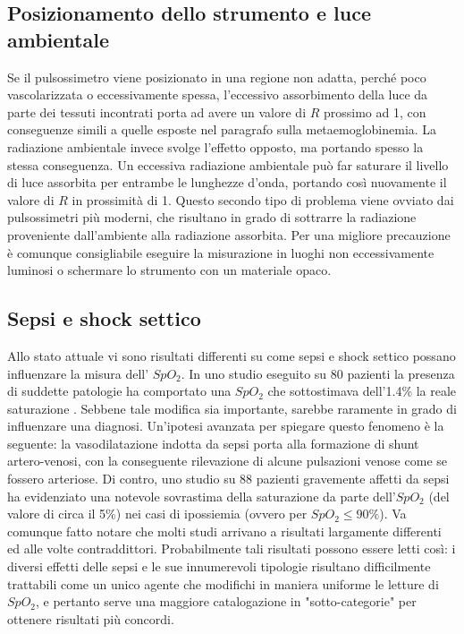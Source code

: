 \documentclass[12pt,a4paper, twoside, openright]{report}
\begin{document}
\subsection{Posizionamento dello strumento e luce ambientale}

Se il pulsossimetro viene posizionato in una regione non adatta, perché poco vascolarizzata o eccessivamente spessa, l'eccessivo assorbimento della luce da parte dei tessuti incontrati porta ad avere un valore di $R$ prossimo ad 1, con conseguenze simili a quelle esposte nel paragrafo sulla metaemoglobinemia. 
La radiazione ambientale invece svolge l'effetto opposto, ma portando spesso la stessa conseguenza. 
Un eccessiva radiazione ambientale può far saturare il livello di luce assorbita per entrambe le lunghezze d'onda, portando così nuovamente il valore di $R$ in prossimità di 1. 
Questo secondo tipo di problema viene ovviato dai pulsossimetri più moderni, che risultano in grado di sottrarre la radiazione proveniente dall'ambiente alla radiazione assorbita. 
Per una migliore precauzione è comunque consigliabile eseguire la misurazione in luoghi non eccessivamente luminosi o schermare lo strumento con un materiale opaco.


\subsection{Sepsi e shock settico}

Allo stato attuale vi sono risultati differenti su come sepsi e shock settico possano influenzare la misura dell' $SpO_2$. 
In uno studio eseguito su 80 pazienti la presenza di suddette patologie ha comportato una $SpO_2$ che sottostimava dell'1.4\% la reale saturazione \cite{Pulseoximeter}. 
Sebbene tale modifica sia importante, sarebbe raramente in grado di influenzare una diagnosi. 
Un'ipotesi avanzata per spiegare questo fenomeno è la seguente: la vasodilatazione indotta da sepsi porta alla formazione di shunt artero-venosi, con la conseguente rilevazione di alcune pulsazioni venose come se fossero arteriose. 
Di contro, uno studio su 88 pazienti gravemente affetti da sepsi ha evidenziato una notevole sovrastima della saturazione da parte dell'$SpO_2$ (del valore di circa il 5\%) nei casi di ipossiemia (ovvero per $SpO_2 \leq 90\%$). 
Va comunque fatto notare che molti studi arrivano a risultati largamente differenti ed alle volte contraddittori. 
Probabilmente tali risultati possono essere letti così: i diversi effetti delle sepsi e le sue innumerevoli tipologie risultano difficilmente trattabili come un unico agente che modifichi in maniera uniforme le letture di $SpO_2$, e pertanto serve una maggiore catalogazione in "sotto-categorie" per ottenere risultati più concordi.
\end{document}
